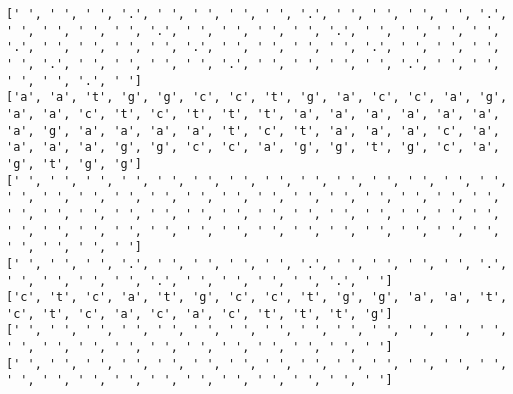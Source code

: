 \documentclass{article}
\begin{document}
\begin{Verbatim}
[' ', ' ', ' ', '.', ' ', ' ', ' ', ' ', '.', ' ', ' ', ' ', ' ', '.', ' ', ' ', ' ', ' ', '.', ' ', ' ', ' ', ' ', '.', ' ', ' ', ' ', ' ', '.', ' ', ' ', ' ', ' ', '.', ' ', ' ', ' ', ' ', '.', ' ', ' ', ' ', ' ', '.', ' ', ' ', ' ', ' ', '.', ' ', ' ', ' ', ' ', '.', ' ', ' ', ' ', ' ', '.', ' ']
['a', 'a', 't', 'g', 'g', 'c', 'c', 't', 'g', 'a', 'c', 'c', 'a', 'g', 'a', 'a', 'c', 't', 'c', 't', 't', 't', 'a', 'a', 'a', 'a', 'a', 'a', 'a', 'g', 'a', 'a', 'a', 'a', 't', 'c', 't', 'a', 'a', 'a', 'c', 'a', 'a', 'a', 'a', 'g', 'g', 'c', 'c', 'a', 'g', 'g', 't', 'g', 'c', 'a', 'g', 't', 'g', 'g']
[' ', ' ', ' ', ' ', ' ', ' ', ' ', ' ', ' ', ' ', ' ', ' ', ' ', ' ', ' ', ' ', ' ', ' ', ' ', ' ', ' ', ' ', ' ', ' ', ' ', ' ', ' ', ' ', ' ', ' ', ' ', ' ', ' ', ' ', ' ', ' ', ' ', ' ', ' ', ' ', ' ', ' ', ' ', ' ', ' ', ' ', ' ', ' ', ' ', ' ', ' ', ' ', ' ', ' ', ' ', ' ', ' ', ' ', ' ', ' ']
[' ', ' ', ' ', '.', ' ', ' ', ' ', ' ', '.', ' ', ' ', ' ', ' ', '.', ' ', ' ', ' ', ' ', '.', ' ', ' ', ' ', ' ', '.', ' ']
['c', 't', 'c', 'a', 't', 'g', 'c', 'c', 't', 'g', 'g', 'a', 'a', 't', 'c', 't', 'c', 'a', 'c', 'a', 'c', 't', 't', 't', 'g']
[' ', ' ', ' ', ' ', ' ', ' ', ' ', ' ', ' ', ' ', ' ', ' ', ' ', ' ', ' ', ' ', ' ', ' ', ' ', ' ', ' ', ' ', ' ', ' ', ' ']
[' ', ' ', ' ', ' ', ' ', ' ', ' ', ' ', ' ', ' ', ' ', ' ', ' ', ' ', ' ', ' ', ' ', ' ', ' ', ' ', ' ', ' ', ' ', ' ', ' ']
 

\end{Verbatim}
\end{document}
